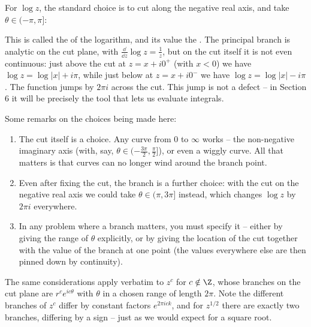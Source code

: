 For $\log z$, the standard choice is to cut along the negative real axis, and take $\theta \in (-\pi, \pi]$:

\begin{center}
\end{center}

This is called the  of the logarithm, and its value the . The principal branch is analytic on the cut plane, with $\frac{\dd}{\dd z}\log z = \frac{1}{z}$, but on the cut itself it is not even continuous: just above the cut at $z = x + i0^+$ (with $x < 0$) we have $\log z = \log|x| + i\pi$, while just below at $z = x + i0^-$ we have $\log z = \log |x| - i\pi$. The function jumps by $2\pi i$ across the cut. This jump is not a defect -- in Section 6 it will be precisely the tool that lets us evaluate integrals.

Some remarks on the choices being made here:
\begin{enumerate}[label=(\roman*)]
	\item The cut itself is a choice. Any curve from $0$ to $\infty$ works -- the non-negative imaginary axis (with, say, $\theta \in (-\frac{3\pi}{2}, \frac{\pi}{2}]$), or even a wiggly curve. All that matters is that curves can no longer wind around the branch point.
	\item Even after fixing the cut, the branch is a further choice: with the cut on the negative real axis we could take $\theta \in (\pi, 3\pi]$ instead, which changes $\log z$ by $2\pi i$ everywhere.
	\item In any problem where a branch matters, you must specify it -- either by giving the range of $\theta$ explicitly, or by giving the location of the cut together with the value of the branch at one point (the values everywhere else are then pinned down by continuity).
\end{enumerate}

The same considerations apply verbatim to $z^c$ for $c \notin \Z$, whose branches on the cut plane are $r^c e^{ic\theta}$ with $\theta$ in a chosen range of length $2\pi$. Note the different branches of $z^c$ differ by constant factors $e^{2\pi i c k}$, and for $z^{1/2}$ there are exactly two branches, differing by a sign -- just as we would expect for a square root.


